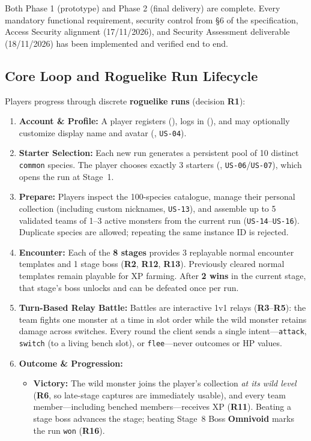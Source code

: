 \documentclass[10.5pt,a4paper]{article}
\DeclareRobustCommand{\code}[1]{\begingroup\def\_{\textunderscore\allowbreak}\texttt{#1}\endgroup}
\begin{document}
Both Phase 1 (prototype) and Phase 2 (final delivery) are complete. Every mandatory functional requirement, security control from §6 of the specification, Access Security alignment (17/11/2026), and Security Assessment deliverable (18/11/2026) has been implemented and verified end to end.

\subsection{Core Loop and Roguelike Run Lifecycle}

Players progress through discrete \textbf{roguelike runs} (decision \textbf{R1}):
\begin{enumerate}
  \item \textbf{Account \& Profile:} A player registers (), logs in (), and may optionally customize display name and avatar (, \code{US-04}).
  \item \textbf{Starter Selection:} Each new run generates a persistent pool of 10 distinct \code{common} species. The player chooses exactly 3 starters (, \code{US-06}/\code{US-07}), which opens the run at Stage~1.
  \item \textbf{Prepare:} Players inspect the 100-species catalogue, manage their personal collection (including custom nicknames, \code{US-13}), and assemble up to 5 validated teams of 1–3 active monsters from the current run (\code{US-14}–\code{US-16}). Duplicate species are allowed; repeating the same instance ID is rejected.
  \item \textbf{Encounter:} Each of the \textbf{8 stages} provides 3 replayable normal encounter templates and 1 stage boss (\textbf{R2}, \textbf{R12}, \textbf{R13}). Previously cleared normal templates remain playable for XP farming. After \textbf{2 wins} in the current stage, that stage's boss unlocks and can be defeated once per run.
  \item \textbf{Turn-Based Relay Battle:} Battles are interactive 1v1 relays (\textbf{R3}–\textbf{R5}): the team fights one monster at a time in slot order while the wild monster retains damage across switches. Every round the client sends a single intent—\code{attack}, \code{switch} (to a living bench slot), or \code{flee}—never outcomes or HP values.
  \item \textbf{Outcome \& Progression:}
    \begin{itemize}
      \item \textbf{Victory:} The wild monster joins the player's collection \emph{at its wild level} (\textbf{R6}, so late-stage captures are immediately usable), and every team member—including benched members—receives XP (\textbf{R11}). Beating a stage boss advances the stage; beating Stage~8 Boss \textbf{Omnivoid} marks the run \code{won} (\textbf{R16}).

\end{itemize}
\end{enumerate}
\end{document}
